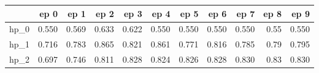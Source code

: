 \begin{tabular}{lrrrrrrrrrr}
\toprule
{} &   ep 0 &   ep 1 &   ep 2 &   ep 3 &   ep 4 &   ep 5 &   ep 6 &   ep 7 &  ep 8 &   ep 9 \\
\midrule
hp\_0 &  0.550 &  0.569 &  0.633 &  0.622 &  0.550 &  0.550 &  0.550 &  0.550 &  0.55 &  0.550 \\
hp\_1 &  0.716 &  0.783 &  0.865 &  0.821 &  0.861 &  0.771 &  0.816 &  0.785 &  0.79 &  0.795 \\
hp\_2 &  0.697 &  0.746 &  0.811 &  0.828 &  0.824 &  0.826 &  0.828 &  0.830 &  0.83 &  0.830 \\
\bottomrule
\end{tabular}
